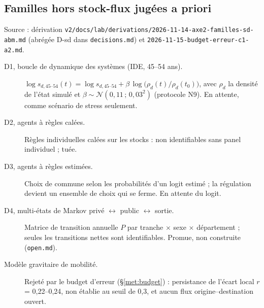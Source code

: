 \subsection{Familles hors stock-flux jugées a priori}
\label{met:horssf}
Source : dérivation \texttt{v2/docs/lab/derivations/2026-11-14-axe2-familles-sd-abm.md} (abrégée D-sd
dans \texttt{decisions.md}) et \texttt{2026-11-15-budget-erreur-c1-a2.md}.
\begin{description}
  \item[D1, boucle de dynamique des systèmes (IDE, 45--54 ans).]
    $\log s_{d,45\text{--}54}(t) = \log s_{d,45\text{--}54} + \beta\,\log\big(\rho_d(t)/\rho_d(t_0)\big)$, avec
    $\rho_d$ la densité de l'état simulé et $\beta \sim \mathcal N(0{,}11\,;\,0{,}03^2)$ (protocole N9). En
    attente, comme scénario de stress seulement.
  \item[D2, agents à règles calées.] Règles individuelles calées sur les stocks : non identifiables sans panel
    individuel ; tuée.
  \item[D3, agents à règles estimées.] Choix de commune selon les probabilités d'un logit estimé ; la
    régulation devient un ensemble de choix qui se ferme. En attente du logit.
  \item[D4, multi-états de Markov privé $\leftrightarrow$ public $\leftrightarrow$ sortie.] Matrice de
    transition annuelle $P$ par tranche $\times$ sexe $\times$ département ; seules les transitions nettes
    sont identifiables. Promue, non construite (\texttt{open.md}).
  \item[Modèle gravitaire de mobilité.] Rejeté par le budget d'erreur (\S\ref{met:budget}) : persistance
    de l'écart local $r$ = 0,22--0,24, non établie au seuil de 0,3, et aucun flux origine--destination ouvert.
\end{description}

